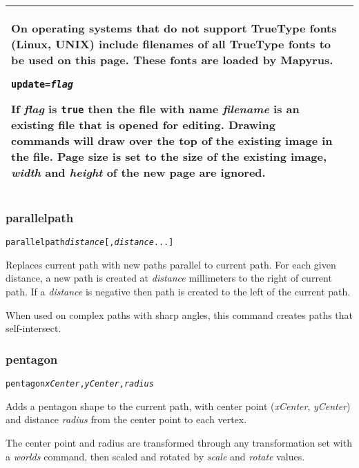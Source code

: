 \begin{longtable}{|p{4cm}|p{10cm}|}
On operating systems that do not support TrueType fonts
(Linux, UNIX) include filenames of all TrueType
fonts to be used on this page.  These fonts are loaded
by Mapyrus.

\vspace{10pt}
\texttt{update=\textit{flag}}

If \textit{flag} is \texttt{true} then the file with name
\textit{filename} is an existing file that is opened for editing.
Drawing commands will draw over the top of the existing image
in the file.
Page size is set to the size of the existing image,
\textit{width} and \textit{height} of the new page are ignored.  \\

\hline

\end{longtable}

\subsubsection{parallelpath}

\begin{alltt}
parallelpath \textit{distance} [, \textit{distance} ...]
\end{alltt}

Replaces current path with new paths parallel to current path.
For each given distance, a new path is created at \textit{distance}
millimeters to the right of current path.  If a \textit{distance} is
negative then path is created to the left of the current path.

When used on complex paths with sharp angles, this command creates
paths that self-intersect.

\subsubsection{pentagon}

\begin{alltt}
pentagon \textit{xCenter}, \textit{yCenter}, \textit{radius}
\end{alltt}

Adds a pentagon shape to the current path, with center
point (\textit{xCenter}, \textit{yCenter}) and distance
\textit{radius}
from the center point to each vertex.

The center point and radius are transformed through any
transformation set with a \textit{worlds} command,
then scaled and rotated by \textit{scale}
and \textit{rotate} values.

